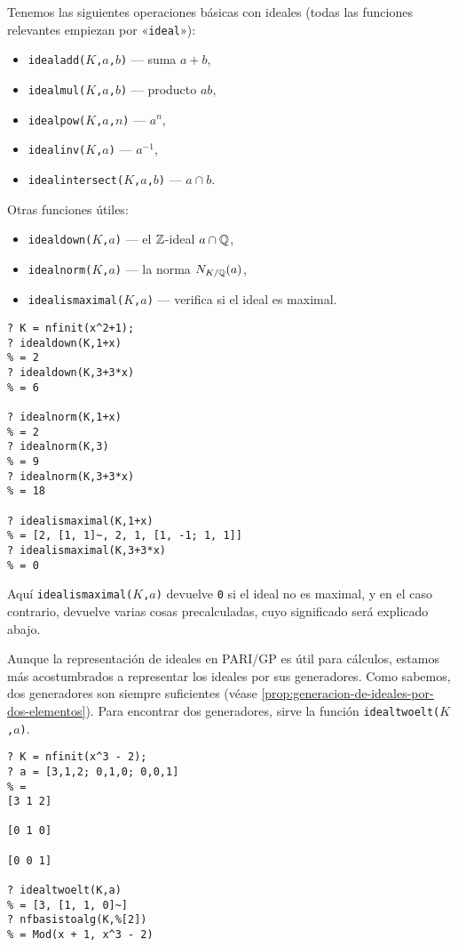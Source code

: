 Tenemos las siguientes operaciones básicas con ideales (todas las funciones
relevantes empiezan por «\texttt{ideal}»):
\begin{itemize}
  \item \texttt{idealadd($K$,$a$,$b$)} --- suma $a+b$,
  \item \texttt{idealmul($K$,$a$,$b$)} --- producto $ab$,
  \item \texttt{idealpow($K$,$a$,$n$)} --- $a^n$,
  \item \texttt{idealinv($K$,$a$)} --- $a^{-1}$,
  \item \texttt{idealintersect($K$,$a$,$b$)} --- $a \cap b$.
\end{itemize}
Otras funciones útiles:
\begin{itemize}
  \item \texttt{idealdown($K$,$a$)} --- el $\mathbb{Z}$-ideal $a \cap \mathbb{Q}$,
  \item \texttt{idealnorm($K$,$a$)} --- la norma $N_{K/\mathbb{Q}} (a)$,
  \item \texttt{idealismaximal($K$,$a$)} --- verifica si el ideal es maximal.
\end{itemize}

\begin{shaded}
\begin{verbatim}
? K = nfinit(x^2+1);
? idealdown(K,1+x)
% = 2
? idealdown(K,3+3*x)
% = 6

? idealnorm(K,1+x)
% = 2
? idealnorm(K,3)
% = 9
? idealnorm(K,3+3*x)
% = 18

? idealismaximal(K,1+x)
% = [2, [1, 1]~, 2, 1, [1, -1; 1, 1]]
? idealismaximal(K,3+3*x)
% = 0
\end{verbatim}
\end{shaded}

Aquí \texttt{idealismaximal($K$,$a$)} devuelve \texttt{0} si el ideal no es
maximal, y en el caso contrario, devuelve varias cosas precalculadas, cuyo
significado será explicado abajo.

Aunque la representación de ideales en PARI/GP es útil para cálculos, estamos
más acostumbrados a representar los ideales por sus generadores. Como sabemos,
dos generadores son siempre suficientes
(véase \ref{prop:generacion-de-ideales-por-dos-elementos}).
Para encontrar dos generadores, sirve la función
\texttt{idealtwoelt($K$,$a$)}.

\begin{shaded}
\begin{verbatim}
? K = nfinit(x^3 - 2);
? a = [3,1,2; 0,1,0; 0,0,1]
% = 
[3 1 2]

[0 1 0]

[0 0 1]

? idealtwoelt(K,a)
% = [3, [1, 1, 0]~]
? nfbasistoalg(K,%[2])
% = Mod(x + 1, x^3 - 2)
\end{verbatim}
\end{shaded}

